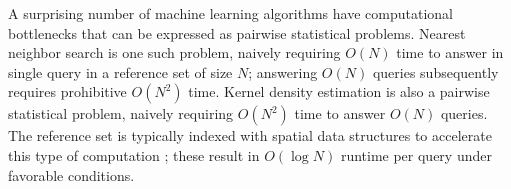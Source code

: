 \documentclass{article} %
\begin{document}
%
%
A surprising number of machine learning algorithms have computational
bottlenecks that can be expressed as pairwise statistical problems.
Nearest neighbor search is one such problem, naively requiring $O(N)$ time
to answer in single query in a reference set of size $N$; answering $O(N)$
queries subsequently requires prohibitive $O(N^2)$ time. Kernel density
estimation is also a pairwise statistical problem, naively requiring $O(N^2)$
time to answer $O(N)$ queries. The reference set is typically indexed with
spatial data structures to accelerate this type of computation
\cite{finkel1974quad, langford2006}; these result in $O(\log N)$ runtime per
query under favorable conditions.
\end{document}
